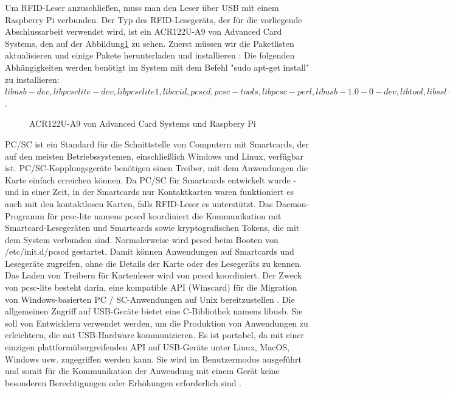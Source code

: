 Um RFID-Leser anzuschließen, muss man den Leser über USB mit einem Raspberry Pi verbunden. Der Typ des RFID-Lesegeräts, der für die vorliegende Abschlussarbeit verwendet wird, ist ein ACR122U-A9 von Advanced Card Systems\cite{website:7}, den auf der Abbildung\ref{fig:rfid_hard} zu sehen. Zuerst müssen wir die Paketlisten aktualisieren und einige Pakete herunterladen und installieren \cite{website:6}: Die folgenden Abhängigkeiten werden benötigt im System mit dem Befehl "sudo apt-get install" zu installieren: $libusb-dev, libpcsclite-dev, libpcsclite1, libccid, pcscd, pcsc-tools, libpcsc-perl, libusb-1.0-0-dev, libtool, libssl-dev$.\\
\begin{figure}
	\caption{ACR122U-A9 von Advanced Card Systems und Raspbery Pi}
	\label{fig:rfid_hard}
\end{figure}
PC/SC ist ein Standard für die Schnittstelle von Computern mit Smartcards, der auf den meisten Betriebssystemen, einschließlich Windows und Linux, verfügbar ist. PC/SC-Kopplungsgeräte benötigen einen Treiber, mit dem Anwendungen die Karte einfach erreichen können. Da PC/SC für Smartcards entwickelt wurde - und in einer Zeit, in der Smartcards nur Kontaktkarten waren funktioniert es auch mit den kontaktlosen Karten, falls RFID-Leser es unterstützt. Das Daemon-Programm für pcsc-lite namens pcscd koordiniert die Kommunikation mit Smartcard-Lesegeräten und Smartcards sowie kryptografischen Tokens, die mit dem System verbunden sind. Normalerweise wird pcscd beim Booten von /etc/init.d/pcscd gestartet. Damit können Anwendungen auf Smartcards und Lesegeräte zugreifen, ohne die Details der Karte oder des Lesegeräts zu kennen. Das Laden von Treibern für Kartenleser wird von pcscd koordiniert. Der Zweck von pcsc-lite besteht darin, eine kompatible API (Winscard) für die Migration von Windows-basierten PC / SC-Anwendungen auf Unix bereitzustellen \cite{website:5}. Die allgemeinen Zugriff auf USB-Geräte bietet eine C-Bibliothek namens libusb.  Sie soll von Entwicklern verwendet werden, um die Produktion von Anwendungen zu erleichtern, die mit USB-Hardware kommunizieren. Es ist portabel, da mit einer einzigen plattformübergreifenden API auf USB-Geräte unter Linux, MacOS, Windows usw. zugegriffen werden kann. Sie wird im Benutzermodus ausgeführt und somit für die Kommunikation der Anwendung mit einem Gerät keine besonderen Berechtigungen oder Erhöhungen erforderlich sind \cite{website:88}.

